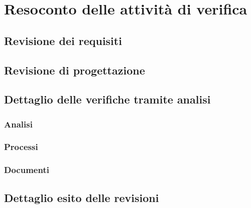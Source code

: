 \section{Resoconto delle attività di verifica}
  \subsection{Revisione dei requisiti}
  \subsection{Revisione di progettazione}
  \subsection{Dettaglio delle verifiche tramite analisi}
    \subsubsection{Analisi}
      \subsubsection{Processi}
      \subsubsection{Documenti}
  \subsection{Dettaglio esito delle revisioni}
